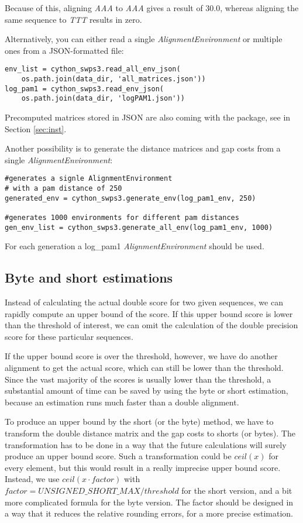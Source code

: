 \documentclass[12pt]{article}
\newcommand{\alenv}{\emph{AlignmentEnvironment}}
\begin{document}
Because of this, aligning \emph{AAA} to \emph{AAA} gives a result of 30.0, whereas aligning the same sequence to \emph{TTT} results in zero.


Alternatively, you can either read a single \alenv{} or multiple ones from a JSON-formatted file:
\begin{lstlisting}
env_list = cython_swps3.read_all_env_json(
    os.path.join(data_dir, 'all_matrices.json'))
log_pam1 = cython_swps3.read_env_json(
    os.path.join(data_dir, 'logPAM1.json'))
\end{lstlisting}

Precomputed matrices stored in JSON are also coming with the package, see in Section \ref{sec:inst}.

Another possibility is to generate the distance matrices and gap costs from a single \alenv{}:

\begin{lstlisting}
#generates a signle AlignmentEnvironment
# with a pam distance of 250
generated_env = cython_swps3.generate_env(log_pam1_env, 250)

#generates 1000 environments for different pam distances
gen_env_list = cython_swps3.generate_all_env(log_pam1_env, 1000)
\end{lstlisting}

For each generation a log\_pam1 \alenv{} should be used.

\subsection{Byte and short estimations}
\label{subsec:bsEstim}
Instead of calculating the actual double score for two given sequences, we can rapidly compute an upper bound of the score. If this upper bound score is lower than the threshold of interest, we can omit the calculation of the double precision score for these particular sequences.

If the upper bound score is over the threshold, however, we have do another alignment to get the actual
 score, which can still be lower than the threshold. Since the vast majority of the scores is usually lower than the threshold, a substantial amount of time can be saved by using the byte or short estimation, because an estimation runs much faster than a double alignment.

To produce an upper bound by the short (or the byte) method, we have to transform the double distance matrix and the gap costs to shorts (or bytes). The transformation has to be done in a way that the future calculations will surely produce an upper bound score. Such a transformation could be $ceil(x)$ for every element, but this would result in a really imprecise upper bound score. Instead, we use $ceil(x \cdot factor)$ with $factor=UNSIGNED\_SHORT\_MAX / threshold$ for the short version, and a bit more complicated formula for the byte version. The factor should be designed in a way that it reduces the relative rounding errors, for a more precise estimation.
\end{document}
